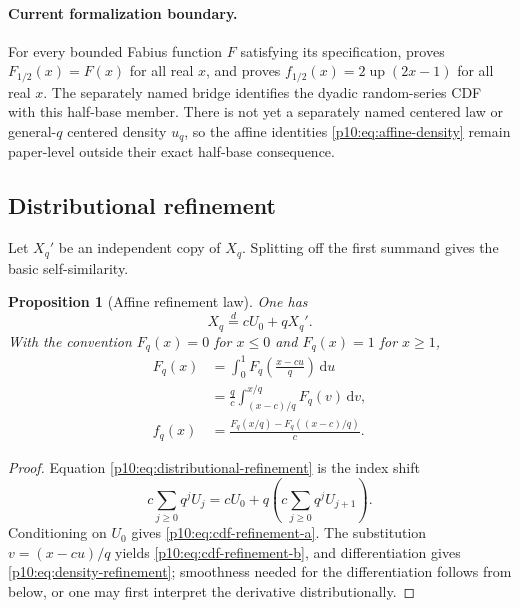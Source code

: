 \documentclass[11pt]{article}
\numberwithin{equation}{section}
\newtheorem{proposition}[theorem]{Proposition}
\theoremstyle{definition}
\theoremstyle{remark}
\newcommand{\Up}{\operatorname{up}}
\newcommand{\dd}{\,\mathrm d}
\begin{document}
\paragraph{Current formalization boundary.}
For every bounded Fabius function \(F\) satisfying its specification,
 proves
\(F_{1/2}(x)=F(x)\) for all real \(x\), and
 proves
\(f_{1/2}(x)=2\Up(2x-1)\) for all real \(x\).  The separately named bridge
 identifies the dyadic random-series
CDF with this half-base member.  There is not yet a separately named centered law or
general-\(q\) centered density \(u_q\), so the affine identities
\eqref{p10:eq:affine-density} remain paper-level outside their exact half-base consequence.

\subsection{Distributional refinement}

Let $X_q'$ be an independent copy of $X_q$.  Splitting off the first summand gives the basic
self-similarity.

\begin{proposition}[Affine refinement law]
\label{p10:prop:refinement}
One has
\begin{equation}
 X_q\overset d=cU_0+qX_q'.                  \label{p10:eq:distributional-refinement}
\end{equation}
With the convention $F_q(x)=0$ for $x\le0$ and $F_q(x)=1$ for $x\ge1$,
\begin{align}
 F_q(x)
 &=\int_0^1 F_q\!\left(\frac{x-cu}{q}\right)\dd u            \label{p10:eq:cdf-refinement-a}\\
 &=\frac{q}{c}\int_{(x-c)/q}^{x/q}F_q(v)\dd v,               \label{p10:eq:cdf-refinement-b}\\
 f_q(x)
 &=\frac{F_q(x/q)-F_q((x-c)/q)}{c}.                            \label{p10:eq:density-refinement}
\end{align}
\end{proposition}

\begin{proof}
Equation \eqref{p10:eq:distributional-refinement} is the index shift
\[
 c\sum_{j\ge0}q^jU_j=cU_0+q\left(c\sum_{j\ge0}q^jU_{j+1}\right).
\]
Conditioning on $U_0$ gives \eqref{p10:eq:cdf-refinement-a}.  The substitution
$v=(x-cu)/q$ yields \eqref{p10:eq:cdf-refinement-b}, and differentiation gives
\eqref{p10:eq:density-refinement}; smoothness needed for the differentiation follows from
 below, or one may first interpret the derivative distributionally.
\end{proof}
\end{document}
